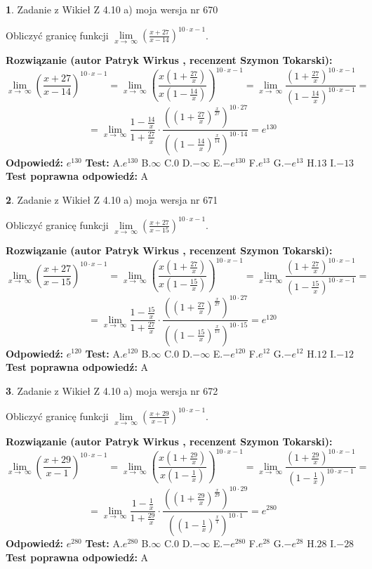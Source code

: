 \documentclass[12pt, a4paper]{article}
\theoremstyle{definition} %
\newtheorem{zad}{}
\newcommand{\zadStart}[1]{\begin{zad}#1\newline}
\newcommand{\zadStop}{\end{zad}}
\newcommand{\rozwStart}[2]{\noindent \textbf{Rozwiązanie (autor #1 , recenzent #2): }\newline}
\newcommand{\rozwStop}{\newline}
\newcommand{\odpStart}{\noindent \textbf{Odpowiedź:}\newline}
\newcommand{\odpStop}{\newline}
\newcommand{\testStart}{\noindent \textbf{Test:}\newline}
\newcommand{\testStop}{\newline}
\newcommand{\kluczStart}{\noindent \textbf{Test poprawna odpowiedź:}\newline}
\newcommand{\kluczStop}{\newline}
\begin{document}
\zadStart{Zadanie z Wikieł Z 4.10 a) moja wersja nr 670}

Obliczyć granicę funkcji  $\lim\limits_{x\to\ \infty}(\frac{x+27}{x-14})^{10\cdot x-1}$.
\zadStop
\rozwStart{Patryk Wirkus}{Szymon Tokarski}
$$\lim\limits_{x\to\ \infty}(\frac{x+27}{x-14})^{10\cdot x-1} = \lim\limits_{x\to\ \infty}(\frac{x(1+\frac{27}{x})}{x(1-\frac{14}{x})})^{10\cdot x-1}=\lim\limits_{x\to\ \infty}\frac{(1+\frac{27}{x})^{10\cdot x-1}}{(1-\frac{14}{x})^{10\cdot x-1}}=$$
$$=\lim\limits_{x\to\ \infty}\frac{1-\frac{14}{x}}{1+\frac{27}{x}}\cdot\frac{((1+\frac{27}{x})^{\frac{x}{27}})^{10\cdot27}}{((1-\frac{14}{x})^{\frac{x}{14}})^{10\cdot14}}=e^{130}$$
\rozwStop
\odpStart
$e^{130}$
\odpStop
\testStart
A.$e^{130}$ B.$\infty$ C.$0$ D.$-\infty$ E.$-e^{130}$
F.$e^{13}$ G.$-e^{13}$
H.$13$
I.$-13$
\testStop
\kluczStart
A
\kluczStop



\zadStart{Zadanie z Wikieł Z 4.10 a) moja wersja nr 671}

Obliczyć granicę funkcji  $\lim\limits_{x\to\ \infty}(\frac{x+27}{x-15})^{10\cdot x-1}$.
\zadStop
\rozwStart{Patryk Wirkus}{Szymon Tokarski}
$$\lim\limits_{x\to\ \infty}(\frac{x+27}{x-15})^{10\cdot x-1} = \lim\limits_{x\to\ \infty}(\frac{x(1+\frac{27}{x})}{x(1-\frac{15}{x})})^{10\cdot x-1}=\lim\limits_{x\to\ \infty}\frac{(1+\frac{27}{x})^{10\cdot x-1}}{(1-\frac{15}{x})^{10\cdot x-1}}=$$
$$=\lim\limits_{x\to\ \infty}\frac{1-\frac{15}{x}}{1+\frac{27}{x}}\cdot\frac{((1+\frac{27}{x})^{\frac{x}{27}})^{10\cdot27}}{((1-\frac{15}{x})^{\frac{x}{15}})^{10\cdot15}}=e^{120}$$
\rozwStop
\odpStart
$e^{120}$
\odpStop
\testStart
A.$e^{120}$ B.$\infty$ C.$0$ D.$-\infty$ E.$-e^{120}$
F.$e^{12}$ G.$-e^{12}$
H.$12$
I.$-12$
\testStop
\kluczStart
A
\kluczStop



\zadStart{Zadanie z Wikieł Z 4.10 a) moja wersja nr 672}

Obliczyć granicę funkcji  $\lim\limits_{x\to\ \infty}(\frac{x+29}{x-1})^{10\cdot x-1}$.
\zadStop
\rozwStart{Patryk Wirkus}{Szymon Tokarski}
$$\lim\limits_{x\to\ \infty}(\frac{x+29}{x-1})^{10\cdot x-1} = \lim\limits_{x\to\ \infty}(\frac{x(1+\frac{29}{x})}{x(1-\frac{1}{x})})^{10\cdot x-1}=\lim\limits_{x\to\ \infty}\frac{(1+\frac{29}{x})^{10\cdot x-1}}{(1-\frac{1}{x})^{10\cdot x-1}}=$$
$$=\lim\limits_{x\to\ \infty}\frac{1-\frac{1}{x}}{1+\frac{29}{x}}\cdot\frac{((1+\frac{29}{x})^{\frac{x}{29}})^{10\cdot29}}{((1-\frac{1}{x})^{\frac{x}{1}})^{10\cdot1}}=e^{280}$$
\rozwStop
\odpStart
$e^{280}$
\odpStop
\testStart
A.$e^{280}$ B.$\infty$ C.$0$ D.$-\infty$ E.$-e^{280}$
F.$e^{28}$ G.$-e^{28}$
H.$28$
I.$-28$
\testStop
\kluczStart
A
\kluczStop
\end{document}
